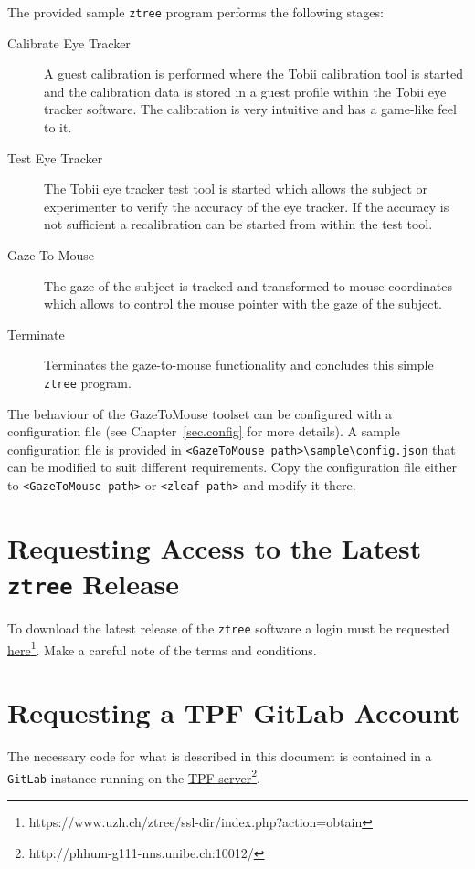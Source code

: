 \documentclass[a4paper,oneside]{book}
\begin{document}
The provided sample \texttt{ztree} program performs the following stages:
\begin{description}
    \item[Calibrate Eye Tracker]
        A guest calibration is performed where the Tobii calibration tool is started and the calibration data is stored in a guest profile within the Tobii eye tracker software.
        The calibration is very intuitive and has a game-like feel to it.
    \item[Test Eye Tracker]
        The Tobii eye tracker test tool is started which allows the subject or experimenter to verify the accuracy of the eye tracker.
        If the accuracy is not sufficient a recalibration can be started from within the test tool.
    \item[Gaze To Mouse]
        The gaze of the subject is tracked and transformed to mouse coordinates which allows to control the mouse pointer with the gaze of the subject.
    \item[Terminate]
        Terminates the gaze-to-mouse functionality and concludes this simple \texttt{ztree} program.
\end{description}

The behaviour of the GazeToMouse toolset can be configured with a configuration file (see Chapter~\ref{sec.config} for more details).
A sample configuration file is provided in \texttt{<GazeToMouse path>\textbackslash sample\textbackslash config.json} that can be modified to suit different requirements.
Copy the configuration file either to \texttt{<GazeToMouse path>} or \texttt{<zleaf path>} and modify it there.

\section{Requesting Access to the Latest \texttt{ztree} Release}
\label{sec.ztree}
To download the latest release of the \texttt{ztree} software a login must be requested \href{https://www.uzh.ch/ztree/ssl-dir/index.php?action=obtain}{here}\footnote{https://www.uzh.ch/ztree/ssl-dir/index.php?action=obtain}.
Make a careful note of the terms and conditions.

\section{Requesting a TPF GitLab Account}
\label{sec.gitlab}
The necessary code for what is described in this document is contained in a \texttt{GitLab} instance running on the \href{http://phhum-g111-nns.unibe.ch:10012/}{TPF server}\footnote{http://phhum-g111-nns.unibe.ch:10012/}.
\end{document}
